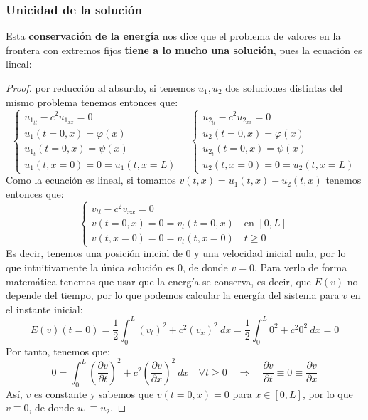 \subsubsection{Unicidad de la solución}
\noindent
Esta \textbf{conservación de la energía} nos dice que el problema de valores en la frontera con extremos fijos \textbf{tiene a lo mucho una solución}, pues la ecuación es lineal:
\begin{proof}
    por reducción al absurdo, si tenemos $u_1,u_2$ dos soluciones distintas del mismo problema tenemos entonces que: 
    \begin{equation*}
        \left\{\begin{array}{l}
            u_{1_{tt}} - c^2 u_{1_{xx}} = 0 \\
            u_1(t=0,x) = \varphi(x) \\
            u_{1_t}(t=0,x) = \psi(x) \\
            u_1(t,x=0) = 0 = u_1(t,x=L)
        \end{array}\right.\quad 
        \left\{\begin{array}{l}
            u_{2_{tt}} - c^2 u_{2_{xx}} = 0 \\
            u_2(t=0,x) = \varphi(x) \\
            u_{2_t}(t=0,x) = \psi(x) \\
            u_2(t,x=0) = 0 = u_2(t,x=L)
        \end{array}\right.
    \end{equation*}
    Como la ecuación es lineal, si tomamos $v(t,x) = u_1(t,x) - u_2(t,x)$ tenemos entonces que:
    \begin{equation*}
        \left\{\begin{array}{l}
            v_{tt} - c^2 v_{xx} = 0 \\
            v(t=0,x) = 0 = v_t(t=0,x) \quad \text{en\ } [0,L] \\
            v(t,x=0) = 0 = v_t(t,x=0) \quad t\geq 0
        \end{array}\right.
    \end{equation*}
    Es decir, tenemos una posición inicial de 0 y una velocidad inicial nula, por lo que intuitivamente la única solución es $0$, de donde $v=0$. Para verlo de forma matemática tenemos que usar que la energía se conserva, es decir, que $E(v)$ no depende del tiempo, por lo que podemos calcular la energía del sistema para $v$ en el instante inicial:
    \begin{equation*}
        E(v)(t=0) = \frac{1}{2}\int_{0}^{L} {(v_t)}^{2}+c^2 {(v_x)}^{2}~dx  = \frac{1}{2}\int_{0}^{L} 0^2 + c^2 0^2~dx  = 0 
    \end{equation*}
    Por tanto, tenemos que:
    \begin{equation*}
        0 = \int_{0}^{L} {\left(\frac{\partial v}{\partial t}\right)}^{2}+c^2 {\left(\frac{\partial v}{\partial x}\right)}^{2}~dx  \quad \forall t\geq 0 \quad\Longrightarrow\quad \frac{\partial v}{\partial t} \equiv 0 \equiv \frac{\partial v}{\partial x}
    \end{equation*}
    Así, $v$ es constante y sabemos que $v(t=0,x) = 0$ para $x\in [0,L]$, por lo que $v\equiv 0$, de donde $u_1 \equiv u_2$.
\end{proof}

